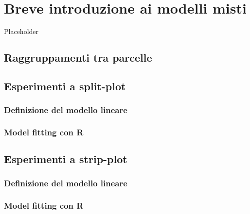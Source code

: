 \documentclass[a4paper,12pt,oneside]{book}
\begin{document}
\hypertarget{breve-introduzione-ai-modelli-misti}{%
\chapter{Breve introduzione ai modelli misti}\label{breve-introduzione-ai-modelli-misti}}

Placeholder

\hypertarget{raggruppamenti-tra-parcelle}{%
\section{Raggruppamenti tra parcelle}\label{raggruppamenti-tra-parcelle}}

\hypertarget{esperimenti-a-split-plot}{%
\section{Esperimenti a split-plot}\label{esperimenti-a-split-plot}}

\hypertarget{definizione-del-modello-lineare-3}{%
\subsection{Definizione del modello lineare}\label{definizione-del-modello-lineare-3}}

\hypertarget{model-fitting-con-r}{%
\subsection{Model fitting con R}\label{model-fitting-con-r}}

\hypertarget{esperimenti-a-strip-plot}{%
\section{Esperimenti a strip-plot}\label{esperimenti-a-strip-plot}}

\hypertarget{definizione-del-modello-lineare-4}{%
\subsection{Definizione del modello lineare}\label{definizione-del-modello-lineare-4}}

\hypertarget{model-fitting-con-r-1}{%
\subsection{Model fitting con R}\label{model-fitting-con-r-1}}
\end{document}
